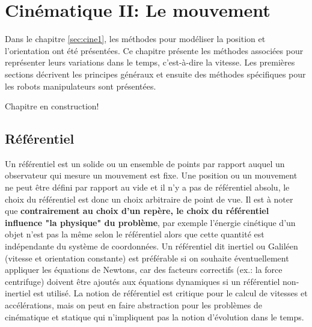 \chapter{Cinématique II: Le mouvement}
\label{sec:cinediff}



Dans le chapitre \ref{sec:cine1}, les méthodes pour modéliser la position et l'orientation ont été présentées. Ce chapitre présente les méthodes associées pour représenter leurs variations dans le temps, c'est-à-dire la vitesse. Les premières sections décrivent les principes généraux et ensuite des méthodes spécifiques pour les robots manipulateurs sont présentées.

Chapitre en construction!


\newpage
\section{Référentiel}

Un référentiel est un solide ou un ensemble de points par rapport auquel un observateur qui mesure un mouvement est fixe. Une position ou un mouvement ne peut être défini par rapport au vide et il n'y a pas de référentiel absolu, le choix du référentiel est donc un choix arbitraire de point de vue. Il est à noter que \textbf{contrairement au choix d'un repère, le choix du référentiel influence "la physique" du problème}, par exemple l'énergie cinétique d'un objet n'est pas la même selon le référentiel alors que cette quantité est indépendante du système de coordonnées. Un référentiel dit inertiel ou Galiléen (vitesse et orientation constante) est préférable si on souhaite éventuellement appliquer les équations de Newtons, car des facteurs correctifs (ex.: la force centrifuge) doivent être ajoutés aux équations dynamiques si un référentiel non-inertiel est utilisé. La notion de référentiel est critique pour le calcul de vitesses et accélérations, mais on peut en faire abstraction pour les problèmes de cinématique et statique qui n'impliquent pas la notion d'évolution dans le temps.


